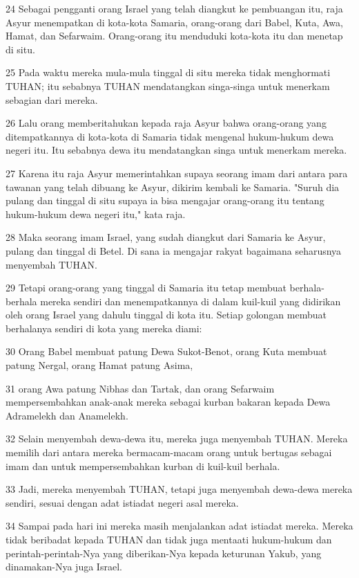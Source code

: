\par 24 Sebagai pengganti orang Israel yang telah diangkut ke pembuangan itu, raja Asyur menempatkan di kota-kota Samaria, orang-orang dari Babel, Kuta, Awa, Hamat, dan Sefarwaim. Orang-orang itu menduduki kota-kota itu dan menetap di situ.
\par 25 Pada waktu mereka mula-mula tinggal di situ mereka tidak menghormati TUHAN; itu sebabnya TUHAN mendatangkan singa-singa untuk menerkam sebagian dari mereka.
\par 26 Lalu orang memberitahukan kepada raja Asyur bahwa orang-orang yang ditempatkannya di kota-kota di Samaria tidak mengenal hukum-hukum dewa negeri itu. Itu sebabnya dewa itu mendatangkan singa untuk menerkam mereka.
\par 27 Karena itu raja Asyur memerintahkan supaya seorang imam dari antara para tawanan yang telah dibuang ke Asyur, dikirim kembali ke Samaria. "Suruh dia pulang dan tinggal di situ supaya ia bisa mengajar orang-orang itu tentang hukum-hukum dewa negeri itu," kata raja.
\par 28 Maka seorang imam Israel, yang sudah diangkut dari Samaria ke Asyur, pulang dan tinggal di Betel. Di sana ia mengajar rakyat bagaimana seharusnya menyembah TUHAN.
\par 29 Tetapi orang-orang yang tinggal di Samaria itu tetap membuat berhala-berhala mereka sendiri dan menempatkannya di dalam kuil-kuil yang didirikan oleh orang Israel yang dahulu tinggal di kota itu. Setiap golongan membuat berhalanya sendiri di kota yang mereka diami:
\par 30 Orang Babel membuat patung Dewa Sukot-Benot, orang Kuta membuat patung Nergal, orang Hamat patung Asima,
\par 31 orang Awa patung Nibhas dan Tartak, dan orang Sefarwaim mempersembahkan anak-anak mereka sebagai kurban bakaran kepada Dewa Adramelekh dan Anamelekh.
\par 32 Selain menyembah dewa-dewa itu, mereka juga menyembah TUHAN. Mereka memilih dari antara mereka bermacam-macam orang untuk bertugas sebagai imam dan untuk mempersembahkan kurban di kuil-kuil berhala.
\par 33 Jadi, mereka menyembah TUHAN, tetapi juga menyembah dewa-dewa mereka sendiri, sesuai dengan adat istiadat negeri asal mereka.
\par 34 Sampai pada hari ini mereka masih menjalankan adat istiadat mereka. Mereka tidak beribadat kepada TUHAN dan tidak juga mentaati hukum-hukum dan perintah-perintah-Nya yang diberikan-Nya kepada keturunan Yakub, yang dinamakan-Nya juga Israel.
